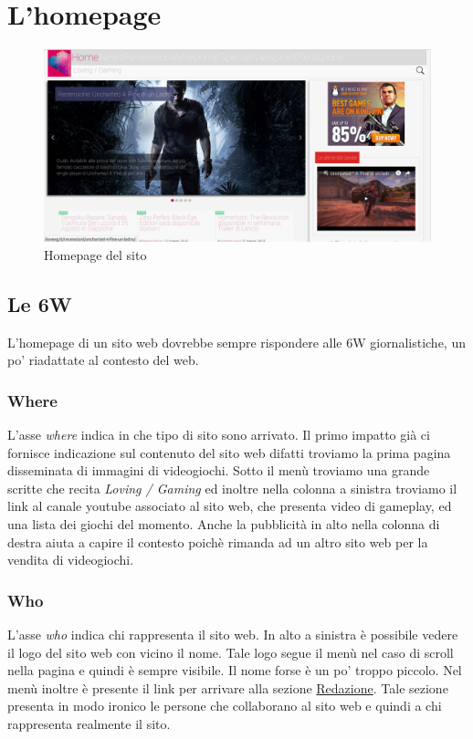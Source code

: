 \documentclass[../ProgettoTecWeb2.tex]{subfiles}
\begin{document}
\section{L'homepage}
	\begin{figure} [H]
		\centering
		\includegraphics[scale=0.3]{img/ScreenHomePage}
		\caption{Homepage del sito}
	\end{figure}
	\subsection{Le 6W}
		L'homepage di un sito web dovrebbe sempre rispondere alle 6W giornalistiche, un po' riadattate al contesto del web.
		\subsubsection{Where}
			L'asse \textit{where} indica in che tipo di sito sono arrivato. Il primo impatto già ci fornisce indicazione sul contenuto del sito web difatti troviamo la prima pagina disseminata di immagini di videogiochi. Sotto il menù troviamo una grande scritte che recita \textit{Loving / Gaming} ed inoltre nella colonna a sinistra troviamo il link al canale youtube associato al sito web, che presenta video di gameplay, ed una lista dei giochi del momento. Anche la pubblicità in alto nella colonna di destra aiuta a capire il contesto poichè rimanda ad un altro sito web per la vendita di videogiochi.
		\subsubsection{Who}
			L'asse \textit{who} indica chi rappresenta il sito web. In alto a sinistra è possibile vedere il logo del sito web con vicino il nome. Tale logo segue il menù nel caso di scroll nella pagina e quindi è sempre visibile. Il nome forse è un po' troppo piccolo. Nel menù inoltre è presente il link per arrivare alla sezione \href{http://ilovevg.it/redazione/}{Redazione}. Tale sezione presenta in modo ironico le persone che collaborano al sito web e quindi a chi rappresenta realmente il sito.
\end{document}
